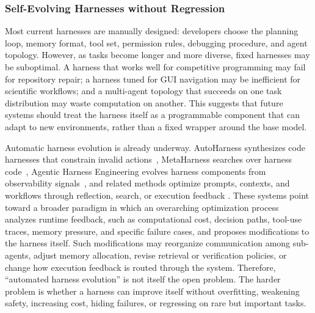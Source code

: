 \subsubsection{Self-Evolving Harnesses without Regression}

Most current harnesses are manually designed: developers choose the planning loop, memory format, tool set, permission rules, debugging procedure, and agent topology. However, as tasks become longer and more diverse, fixed harnesses may be suboptimal. A harness that works well for competitive programming may fail for repository repair; a harness tuned for GUI navigation may be inefficient for scientific workflows; and a multi-agent topology that succeeds on one task distribution may waste computation on another. This suggests that future systems should treat the harness itself as a programmable component that can adapt to new environments, rather than a fixed wrapper around the base model.

Automatic harness evolution is already underway. AutoHarness synthesizes code harnesses that constrain invalid actions~\citep{lou2026autoharness}, MetaHarness searches over harness code~\citep{lee2026metaharness}, Agentic Harness Engineering evolves harness components from observability signals~\citep{lin2026agentic}, and related methods optimize prompts, contexts, and workflows through reflection, search, or execution feedback \citep{agrawal2025gepa,Liu2025SEW,zhang2025agentic}. These systems point toward a broader paradigm in which an overarching optimization process analyzes runtime feedback, such as computational cost, decision paths, tool-use traces, memory pressure, and specific failure cases, and proposes modifications to the harness itself. Such modifications may reorganize communication among sub-agents, adjust memory allocation, revise retrieval or verification policies, or change how execution feedback is routed through the system. Therefore, ``automated harness evolution'' is not itself the open problem. The harder problem is whether a harness can improve itself without overfitting, weakening safety, increasing cost, hiding failures, or regressing on rare but important tasks.

